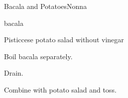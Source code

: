\begin{recipe}{Bacala and Potatoes}{Nonna}{}

\begin{ingredients}
\item bacala
\item Pisticcese potato salad without vinegar
\end{ingredients}

\begin{directions}
\item Boil bacala separately.
\item Drain.
\item Combine with potato salad and toss.
\end{directions}

\end{recipe}
